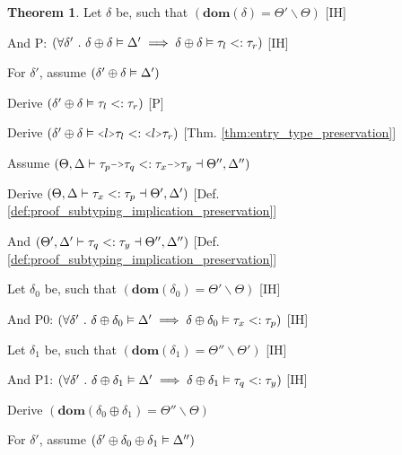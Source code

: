 \documentclass[acmsmall]{acmart}
\theoremstyle{definition}
\newtheorem{theorem}{Theorem}[section]
\begin{document}
\begin{theorem}
  \item \I \N Let $\delta$ be, such that $(
    \textbf{dom}(\delta) = \Theta' \backslash \Theta
  )$ [IH]
  \item \I \N And P: $(
    \forall \delta' \ .\  
    \delta \oplus \delta \vDash \Delta' 
    \implies 
    \delta \oplus \delta \vDash \tau_l <: \tau_r 
  )$ [IH]
  \item \I \N For $\delta'$, assume $(\delta' \oplus \delta \vDash \Delta')$
  \item \I\I \N Derive $(\delta' \oplus \delta \vDash \tau_l <: \tau_r)$ [P]
  \item \I\I \N Derive $(\delta' \oplus \delta \satisfies \J{<}l\J{>}\tau_l \subtypes \J{<}l\J{>}\tau_r)$ [Thm. \ref{thm:entry_type_preservation}]


  \item \N Assume $(
    \Theta, \Delta \entails 
    \tau_{p} \J{->} \tau_{q} 
    \subtypes 
    \tau_{x} \J{->} \tau_{y}
    \given \Theta'', \Delta'' 
  )$

  \item \I \N Derive $(
    \Theta, \Delta \vdash \tau_{x} <: \tau_{p} \dashv \Theta', \Delta'
  )$ [Def. \ref{def:proof_subtyping_implication_preservation}]

  \item \I \N And $(
    \Theta', \Delta' \vdash \tau_{q} <: \tau_{y} \dashv \Theta'', \Delta'' 
  )$ [Def. \ref{def:proof_subtyping_implication_preservation}]

  \item \I \N Let $\delta_0$ be, such that $(
    \textbf{dom}(\delta_0) = \Theta' \backslash \Theta
  )$ [IH]
  \item \I \N And P0: $(
    \forall \delta' \ .\  
    \delta \oplus \delta_0 \vDash \Delta' 
    \implies 
    \delta \oplus \delta_0 \vDash \tau_x <: \tau_p
  )$ [IH]

  \item \I \N Let $\delta_1$ be, such that $(
    \textbf{dom}(\delta_1) = \Theta'' \backslash \Theta'
  )$ [IH]
  \item \I \N And P1: $(
    \forall \delta' \ .\  
    \delta \oplus \delta_1 \vDash \Delta' 
    \implies 
    \delta \oplus \delta_1 \vDash \tau_q <: \tau_y
  )$ [IH]

  \item \I \N Derive $(
    \textbf{dom}(\delta_0 \oplus \delta_1) = \Theta'' \backslash \Theta
  )$
  \item \I \N For $\delta'$, assume $(\delta' \oplus \delta_0 \oplus \delta_1 \vDash \Delta'')$


\end{theorem}
\end{document}
